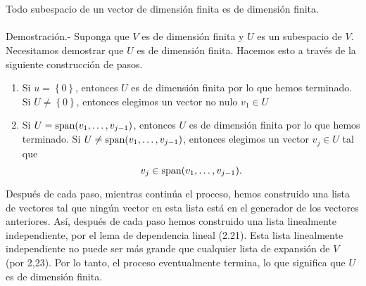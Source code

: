 \setcounter{myteo}{25}
\begin{myteo}\; \\\\
    Todo subespacio de un vector de dimensión finita es de dimensión finita.\\\\
	Demostración.-\; Suponga que $V$ es de dimensión finita y $U$ es un subespacio de $V$. Necesitamos demostrar que $U$ es de dimensión finita. Hacemos esto a través de la siguiente construcción de  pasos. 
	\begin{enumerate}
	    \item Si $u=\left\{0\right\}$, entonces $U$ es de dimensión finita por lo que hemos terminado. Si $U\neq \left\{0\right\}$, entonces elegimos un vector no nulo $v_1\in U$
	    \item Si $U=\mathop{\mbox{\normalfont span}}\nolimits(v_1,\ldots,v_{j-1})$, entonces $U$ es de dimensión finita por lo que hemos terminado. Si $U\neq \mathop{\mbox{\normalfont span}}\nolimits(v_1,\ldots,v_{j-1})$, entonces elegimos un vector $v_j\in U$ tal que 
	    $$v_j\in \mathop{\mbox{\normalfont span}}\nolimits(v_1,\ldots,v_{j-1}).$$
	\end{enumerate}
	Después de cada paso, mientras continúa el proceso, hemos construido una lista de vectores tal que ningún vector en esta lista está en el generador de los vectores anteriores. Así, después de cada paso hemos construido una lista linealmente independiente, por el lema de dependencia lineal (2.21). Esta lista linealmente independiente no puede ser más grande que cualquier lista de expansión de $V$ (por 2,23). Por lo tanto, el proceso eventualmente termina, lo que significa que $U$ es de dimensión finita.
\end{myteo}


\setcounter{mysection}{0}

